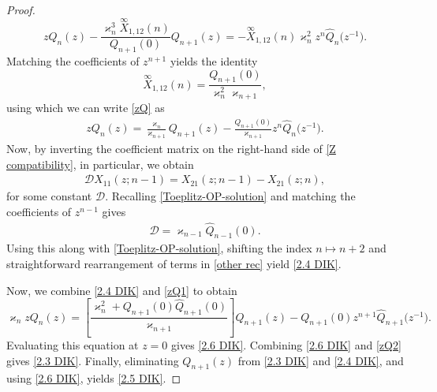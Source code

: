 \documentclass[pdftex]{sigma}
\numberwithin{equation}{section}
\begin{document}
\begin{proof}
\begin{equation}
				z Q_n(z) - \frac{\varkappa^3_n \overset{\infty}{X}_{1,12}(n)}{Q_{n+1}(0)}Q_{n+1}(z) = - \overset{\infty}{X}_{1,12}(n) \varkappa^2_n z^n \widehat{Q}_n\big(z^{-1}\big).
			\end{equation}
			Matching the coefficients of $z^{n+1}$ yields the identity
			\begin{equation*}
				\overset{\infty}{X}_{1,12}(n) = \frac{Q_{n+1}(0)}{\varkappa^2_{n} \varkappa_{n+1}},
			\end{equation*}
			using which we can write \eqref{zQ} as
			\begin{gather}\label{zQ1}
				z Q_n(z) = \frac{\varkappa_n}{\varkappa_{n+1}}Q_{n+1}(z) - \frac{Q_{n+1}(0)}{\varkappa_{n+1}} z^n \widehat{Q}_n\big(z^{-1}\big).
			\end{gather}
			Now, by inverting the coefficient matrix on the right-hand side of \eqref{Z compatibility}, in particular, we obtain
			\begin{gather}\label{other rec}
				\mathcal{D} X_{11}(z;n-1) = X_{21}(z;n-1)-X_{21}(z;n),
			\end{gather}
			for some constant $\mathcal{D}$. Recalling \eqref{Toeplitz-OP-solution} and matching the coefficients of $z^{n-1}$ gives \begin{gather*}
				\mathcal{D} = \varkappa_{n-1}\widehat{Q}_{n-1}(0).
			\end{gather*}
			Using this along with \eqref{Toeplitz-OP-solution}, shifting the index $n \mapsto n+2$	and straightforward rearrangement of terms in \eqref{other rec} yield \eqref{2.4 DIK}.
			
			Now, we combine \eqref{2.4 DIK} and \eqref{zQ1} to obtain
			\begin{equation}\label{zQ2}
				\varkappa_n z Q_n(z) = \left[ \frac{\varkappa^2_{n} + Q_{n+1}(0) \widehat{Q}_{n+1}(0) }{\varkappa_{n+1}} \right] Q_{n+1}(z) - Q_{n+1}(0) z^{n+1} \widehat{Q}_{n+1}\big(z^{-1}\big).
			\end{equation}
			Evaluating this equation at $z=0$ gives \eqref{2.6 DIK}. Combining \eqref{2.6 DIK} and \eqref{zQ2} gives \eqref{2.3 DIK}. Finally, eliminating $Q_{n+1}(z)$ from \eqref{2.3 DIK} and \eqref{2.4 DIK}, and using \eqref{2.6 DIK}, yields \eqref{2.5 DIK}.
		\end{proof}
		
		
\end{document}
